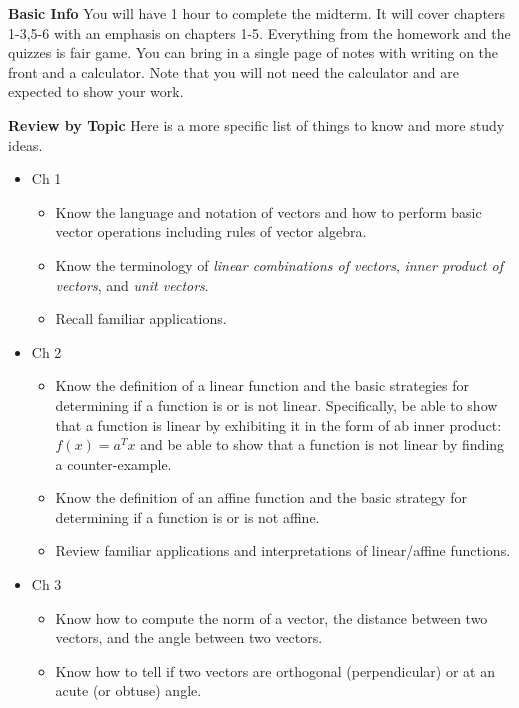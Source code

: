 \documentclass[11pt,fleqn]{article}
\begin{document}
\vspace*{-0.5in}
\begin{center}
 \textbf{ \large {} }
\end{center}

\textbf{Basic Info} You will have 1 hour to complete the midterm. It will cover chapters 1-3,5-6 with an emphasis on chapters 1-5. Everything from the homework and the quizzes is fair game. You can bring in a single page of notes with writing on the front and a calculator. Note that you will not need the calculator and are expected to show your work.

\textbf{Review by Topic} Here is a more specific list of things to know and more study ideas.

	\begin{itemize}
	\item Ch 1 
		\begin{itemize} 
		\item Know the language and notation of vectors and how to perform basic vector operations including rules of vector algebra.
		\item Know the terminology of \emph{linear combinations of vectors}, \emph{inner product of vectors}, and \emph{unit vectors}.
		\item Recall familiar applications.
		\end{itemize}
	\item Ch 2 
		\begin{itemize}
		\item Know the definition of a linear function and the basic strategies for determining if a function is or is not linear. Specifically, be able to show that a function is linear by exhibiting it in the form of
ab inner product: $f(x) = a^T x$ and be able to show that a function is not linear by finding a counter-example.
		\item Know the definition of an affine function and the basic strategy for determining if a function is or is not affine.
		\item Review familiar applications and interpretations of linear/affine functions.
		\end{itemize}
	\item Ch 3
		\begin{itemize}
		\item Know how to compute the norm of a vector, the distance between two vectors, and the angle between two vectors.
		\item Know how to tell if two vectors are orthogonal (perpendicular) or at an acute (or obtuse) angle.

\end{itemize}
\end{itemize}
\end{document}
